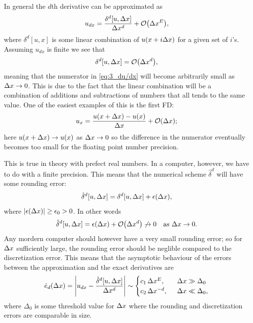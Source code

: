 \documentclass[11pt,letter, swedish, english
]{article}
\begin{document}
In general the $d$th derivative can be approximated as
\begin{equation}\label{eq:3_du/dx}
u_{dx}=\frac{\delta^d[u, \Dx]}{\Dx^d}+\order{\Dx^E},
\end{equation}
where $\delta^d[u, x]$ is some linear combination of $u(x+i\Delta{x})$ for a
given set of $i$'s. Assuming $u_{dx}$ is finite we see that
\begin{equation}
\delta^d[u, \Dx]=\order{\Dx^d},
\end{equation}
meaning that the numerator in \eqref{eq:3_du/dx} will become
arbitrarily small as $\Delta{x}\to0$. This is due to the fact that the
linear combination will be a combination of additions and subtractions
of numbers that all tends to the same value. One of the easiest
examples of this is the first FD:
\begin{equation}
u_x=\frac{u(x+\Dx)-u(x)}{\Dx}+\order{\Dx};
\end{equation}
here $u(x+\Delta{x})\to u(x)$ as $\Delta{x}\to0$ so the difference in the
numerator eventually becomes too small for the floating point number
precision. 

This is true in theory with prefect real numbers. In a computer,
however, we have to do with a finite precision. This means that the
numerical scheme $\hat\delta^d$ will have some rounding error:
\begin{equation}
\hat\delta^d[u, \Delta{x}]=\delta^d[u, \Delta{x}]+\epsilon(\Delta{x}),
\end{equation}
where $|\epsilon(\Delta{x})|\ge\epsilon_0>0$. In other words
\begin{equation}
\hat\delta^d[u, \Dx]=\epsilon(\Dx)+\order{\Dx^d}\not\to0
\quad\text{as } \Dx\to0.
\end{equation}
Any mordern computer should however have a very small rounding error;
so for $\Delta{x}$ sufficiently large, the rounding error should be neglible
compared to the discretization error.
This means that the asymptotic\footnotemark{} behaviour of the errors
between the approximation and the exact derivatives are 
\begin{equation}
\hat{e}_d(\Dx)=\abs{u_{dx}-\frac{\hat\delta^d[u, \Dx]}{\Dx^d}}
\sim\begin{cases}
c_1\,\Dx^E\qcomma& \Dx\gg\Delta_0\\
c_2\,\Dx^{-d},& \Dx\ll\Delta_0,
\end{cases}
\end{equation}
where $\Delta_0$ is some threshold value for $\Delta{x}$ where the rounding
and discretization errors are comparable in size. 
\end{document}
